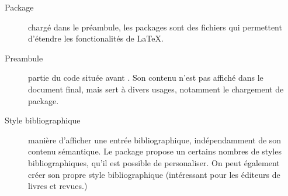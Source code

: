 \begin{description}
\item[Package]chargé dans le préambule, les packages sont des fichiers qui permettent d'étendre les fonctionalités  de \LaTeX.

\item[Preambule]partie du code  située avant . Son contenu n'est pas affiché dans le document final, mais sert à divers usages, notamment le chargement de package.

\item[Style bibliographique]manière d'afficher une entrée bibliographique, indépendamment de son contenu sémantique. Le package  propose un certains nombres de styles bibliographiques, qu'il est possible de personaliser. On peut également créer son propre style bibliographique (intéressant pour les éditeurs de livres et revues.)
\end{description}
